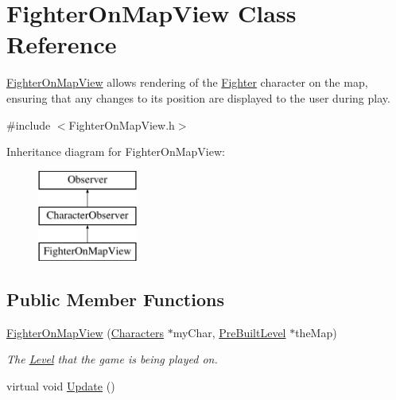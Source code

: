 \hypertarget{class_fighter_on_map_view}{}\section{Fighter\+On\+Map\+View Class Reference}
\label{class_fighter_on_map_view}


\hyperlink{class_fighter_on_map_view}{Fighter\+On\+Map\+View} allows rendering of the \hyperlink{class_fighter}{Fighter} character on the map, ensuring that any changes to its position are displayed to the user during play.  




{\ttfamily \#include $<$Fighter\+On\+Map\+View.\+h$>$}

Inheritance diagram for Fighter\+On\+Map\+View\+:\begin{figure}[H]
\begin{center}
\leavevmode
\includegraphics[height=3.000000cm]{class_fighter_on_map_view}
\end{center}
\end{figure}
\subsection*{Public Member Functions}
\begin{DoxyCompactItemize}
\item 
\hyperlink{class_fighter_on_map_view_a825620eacc7214901bd8d5b640fbb1c2}{Fighter\+On\+Map\+View} (\hyperlink{class_characters}{Characters} $\ast$my\+Char, \hyperlink{class_pre_built_level}{Pre\+Built\+Level} $\ast$the\+Map)
\begin{DoxyCompactList}\small\item\em The \hyperlink{class_level}{Level} that the game is being played on. \end{DoxyCompactList}\item 
virtual void \hyperlink{class_fighter_on_map_view_a7f091d8f5f3c46f7a7670c46210673bc}{Update} ()
\end{DoxyCompactItemize}
